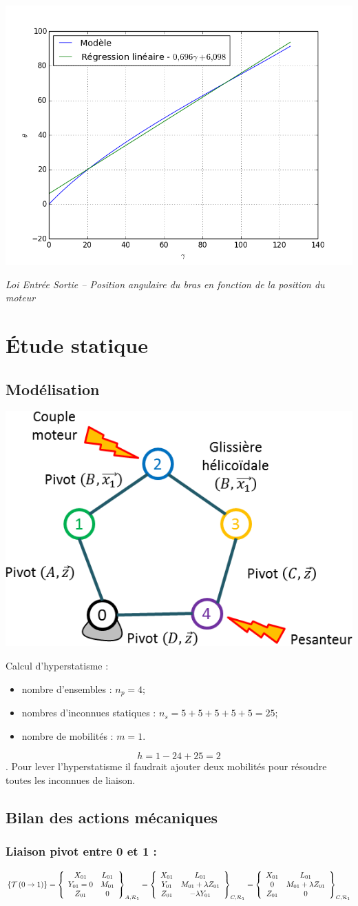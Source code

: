 \documentclass[10pt,fleqn]{article} %
\begin{document}
\begin{center}
\includegraphics[width=.45\textwidth]{images/LoiTheorique}

\textit{Loi Entrée Sortie -- Position angulaire du bras en fonction de la position du moteur} 
\end{center}
\section{Étude statique}
\subsection{Modélisation}
\begin{center}
\includegraphics[width=.45\textwidth]{images/graphe_structure}
\end{center}

Calcul d'hyperstatisme : 
\begin{itemize}
\item nombre d'ensembles : $n_p=4$;
\item nombres d'inconnues statiques : $n_s = 5+5+5+5+5 = 25$;
\item nombre de mobilités : $m=1$. 
\end{itemize}
$$h = 1-24+25=2$$. Pour lever l'hyperstatisme il faudrait ajouter deux mobilités pour résoudre toutes les inconnues de liaison. 
\subsection{Bilan des actions mécaniques}

\subsubsection*{Liaison pivot entre 0 et 1 :}
$$
\torseurstat{T}{0}{1}
=\torseurcol{X_{01}}{Y_{01}=0}{Z_{01}}{L_{01}}{M_{01}}{0}{A,\mathcal{R}_1}
=\torseurcol{X_{01}}{Y_{01}}{Z_{01}}{L_{01}}{M_{01}+\lambda Z_{01}}{-\lambda Y_{01}}{C,\mathcal{R}_1}
=\torseurcol{X_{01}}{0}{Z_{01}}{L_{01}}{M_{01}+\lambda Z_{01}}{0}{C,\mathcal{R}_1}
$$
\end{document}
